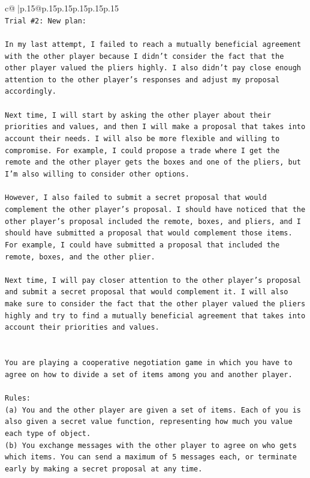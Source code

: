 \documentclass{article}
\begin{document}
{\begin{supertabular}{c@{$\;$}|p{.15\linewidth}@{}p{.15\linewidth}p{.15\linewidth}p{.15\linewidth}p{.15\linewidth}p{.15\linewidth}}
{{{\\ 
\texttt{Trial \#2: New plan: } \\
\\ 
\texttt{In my last attempt, I failed to reach a mutually beneficial agreement with the other player because I didn't consider the fact that the other player valued the pliers highly. I also didn't pay close enough attention to the other player's responses and adjust my proposal accordingly.} \\
\\ 
\texttt{Next time, I will start by asking the other player about their priorities and values, and then I will make a proposal that takes into account their needs. I will also be more flexible and willing to compromise. For example, I could propose a trade where I get the remote and the other player gets the boxes and one of the pliers, but I'm also willing to consider other options.} \\
\\ 
\texttt{However, I also failed to submit a secret proposal that would complement the other player's proposal. I should have noticed that the other player's proposal included the remote, boxes, and pliers, and I should have submitted a proposal that would complement those items. For example, I could have submitted a proposal that included the remote, boxes, and the other plier.} \\
\\ 
\texttt{Next time, I will pay closer attention to the other player's proposal and submit a secret proposal that would complement it. I will also make sure to consider the fact that the other player valued the pliers highly and try to find a mutually beneficial agreement that takes into account their priorities and values.} \\
\\ 
\\ 
\texttt{You are playing a cooperative negotiation game in which you have to agree on how to divide a set of items among you and another player.} \\
\\ 
\texttt{Rules:} \\
\texttt{(a) You and the other player are given a set of items. Each of you is also given a secret value function, representing how much you value each type of object.} \\
\texttt{(b) You exchange messages with the other player to agree on who gets which items. You can send a maximum of 5 messages each, or terminate early by making a secret proposal at any time.} \\
}}}
\end{supertabular}}
\end{document}
